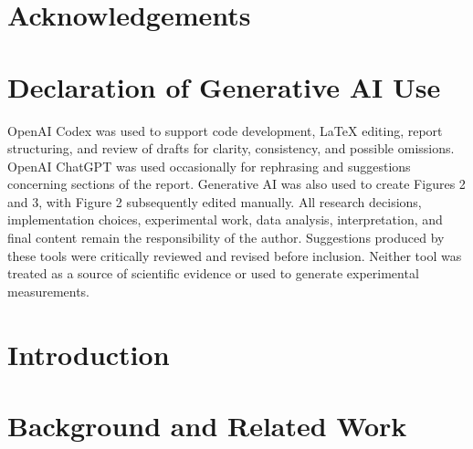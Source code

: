 \documentclass[a4paper,12pt]{article}
\begin{document}
\glsresetall
\begin{sammanfattning}

\end{sammanfattning}

\section*{Acknowledgements}


\section*{Declaration of Generative AI Use}
OpenAI Codex was used to support code development, LaTeX editing, report structuring, and review of drafts for clarity, consistency, and possible omissions. OpenAI ChatGPT was used occasionally for rephrasing and suggestions concerning sections of the report. Generative AI was also used to create Figures 2 and 3, with Figure 2 subsequently edited manually. All research decisions, implementation choices, experimental work, data analysis, interpretation, and final content remain the responsibility of the author. Suggestions produced by these tools were critically reviewed and revised before inclusion. Neither tool was treated as a source of scientific evidence or used to generate experimental measurements.
\newpage

\tableofcontents

\clearpage

\printglossary[title=Acronyms, toctitle=Acronyms]

\cleardoublepage

\glsresetall
\mainmatter



\section{Introduction}
\label{sec:introduction}


\clearpage
\section{Background and Related Work}
\label{sec:background}

\end{document}
